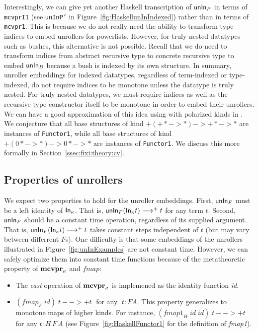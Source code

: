 Interestingly, we can give yet another
Haskell transcription of $\mathsf{unIn}_P$ in terms of \texttt{mcvprI1}
(see \texttt{unInP'} in Figure~\ref{fig:HaskellunInIndexed})
rather than in terms of \texttt{mcvpr1}. This is because we do not
really need the ability to transform type indices to embed unrollers
for powerlists. However, for truly nested datatypes such as bushes,
this alternative is not possible. Recall that we do need to
transform indices from abstract recursive type to concrete recursive type
to embed $\mathsf{unIn}_B$ because a bush is indexed by its own structure.
In summary, unroller embeddings for indexed datatypes, regardless of
term-indexed or type-indexed, do not require indices to be monotone
unless the datatype is truly nested. For truly nested datatypes,
we must require indices as well as the recursive type constructor itself
to be monotone in order to embed their unrollers. We can have
a good approximation of this idea using with polarized kinds in \Fixi.
We conjecture that all base structures of kind $+(+* -> *) -> +* -> *$
are instances of \texttt{Functor1}, while all base structures of kind
$+(0* -> *) -> 0* -> *$ are instances of \texttt{Functor1}. We discuss this
more formally in Section~\ref{ssec:fixi:theory:cv}.

\subsection{Properties of unrollers}
We expect two properties to hold for the unroller embeddings.
First, $\mathsf{unIn}_F$ must be a left identity of $\mathsf{In}_\kappa$.
That is, $\mathsf{unIn}_F(\mathsf{In}_\kappa t) -->+ t$ for any term $t$.
Second, $\mathsf{unIn}_F$ should be a constant time operation, regardless of its
supplied argument. That is, $\mathsf{unIn}_F(\mathsf{In}_\kappa t) -->+ t$ takes
constant steps independent of $t$ (but may vary between differrent $F$s).
One difficulty is that some embeddings of the unrollers illustrated in
Figure~\ref{fig:unInExamples} are not constant time. However, we can
safely optimize them into constant time functions because of
the metatheoretic property of $\mathbf{mcvpr}_\kappa$ and $\textit{fmap}$:
\begin{itemize}
\item The \textit{cast} operation of $\mathbf{mcvpr}_\kappa$
	is implemened as the identity function \textit{id}.
\item $(\textit{fmap}_F\;\textit{id})\;t -->+ t\;$ for any $\;t : F A$.
	This property generalizes to monotone maps of higher kinds.
	For instance,
      $(\textit{fmap1}_H\;\textit{id}\;\textit{id})\;t -->+ t$
      for any $t : H\,F\,A$ (see Figure~\ref{fig:HaskellFunctor1}
      for the definition of \textit{fmap1}).
\end{itemize}

